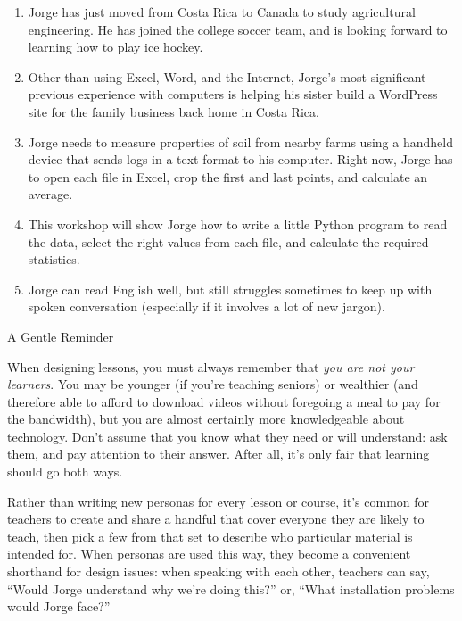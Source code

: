 \begin{enumerate}
\item
  Jorge has just moved from Costa Rica to Canada to study
  agricultural engineering. He has joined the college soccer team,
  and is looking forward to learning how to play ice hockey.
\item
  Other than using Excel, Word, and the Internet, Jorge's most
  significant previous experience with computers is helping his
  sister build a WordPress site for the family business back home in
  Costa Rica.
\item
  Jorge needs to measure properties of soil from nearby farms using a
  handheld device that sends logs in a text format to his computer.
  Right now, Jorge has to open each file in Excel, crop the first and
  last points, and calculate an average.
\item
  This workshop will show Jorge how to write a little Python program
  to read the data, select the right values from each file, and
  calculate the required statistics.
\item
  Jorge can read English well, but still struggles sometimes to keep
  up with spoken conversation (especially if it involves a lot of new
  jargon).
\end{enumerate}

\begin{aside}{A Gentle Reminder}

When designing lessons, you must always remember that \emph{you are not
your learners}. You may be younger (if you're teaching seniors) or
wealthier (and therefore able to afford to download videos without
foregoing a meal to pay for the bandwidth), but you are almost
certainly more knowledgeable about technology. Don't assume that you
know what they need or will understand: ask them, and pay attention
to their answer. After all, it's only fair that learning should go
both ways.

\end{aside}

Rather than writing new personas for every lesson or course, it's
common for teachers to create and share a handful that cover everyone
they are likely to teach, then pick a few from that set to describe
who particular material is intended for. When personas are used this
way, they become a convenient shorthand for design issues: when
speaking with each other, teachers can say, ``Would Jorge understand
why we're doing this?'' or, ``What installation problems would Jorge
face?''

